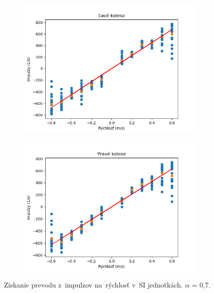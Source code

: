 \begin{figure}[!htbp]
	\begin{subfigure}{0.5\textwidth}
		\includegraphics[width=\textwidth]{img/lw_07250.png}
	\end{subfigure}
	\hfill
	\begin{subfigure}{0.5\textwidth}
		\includegraphics[width=\textwidth]{img/rw_07250.png}
	\end{subfigure}
	\caption{Získanie prevodu z~impulzov na~rýchlosť v~SI jednotkách. $\alpha$ = 0,7.}
	\label{fig:rw_lw_07250}
\end{figure}

